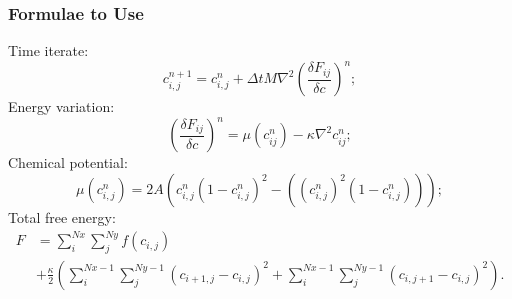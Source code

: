 \documentclass[compress,xcolor={dvipsnames}]{beamer}
\begin{document}
\begin{frame}
    \frametitle{Formulae to Use}
    Time iterate:
    \[
        \scriptstyle
        c^{n+1}_{i,j} = c^n_{i,j}+ \Delta t  M \nabla^2 \left( \frac{\delta F_{ij}}{\delta c} \right)^n;
    \]
    Energy variation:
    \[
        \scriptstyle
        \left( \frac{\delta F_{ij}}{\delta c} \right)^n = \mu\left(c^n_{ij}\right) - \kappa\nabla^2c^n_{ij};
    \]
    Chemical potential:
    \[
        \scriptstyle
        \mu(c^n_{i,j}) = 2A(c^n_{i,j}(1-c^n_{i,j})^2 - ((c^n_{i,j})^2 (1-c^n_{i,j})));
    \]
    Total free energy:
    \begin{align*}
        \scriptstyle
        F &
        \scriptstyle
        = \sum_i^{Nx}\sum_{j}^{Ny}f(c_{i,j}) \\
          &
        \scriptstyle
        + \frac{\kappa}{2}\left( \sum_i^{Nx-1}\sum_{j}^{Ny-1}(c_{i+1,j}-c_{i,j})^2 + \sum_i^{Nx-1}\sum_{j}^{Ny-1}(c_{i,j+1}-c_{i,j})^2 \right) .
    \end{align*}
\end{frame}
\end{document}
